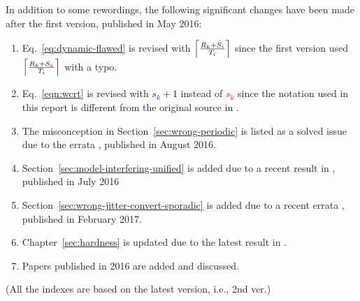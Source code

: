 \documentclass[twoside,titlepage,fleqn,
                pointlessnumbers,headinclude,BCOR5mm,
                ]{scrreprt}
\newcommand{\ceiling}[1]{\left\lceil{#1}\right\rceil}
\begin{document}
In addition to some rewordings, the following significant changes have
been made after the first version, published in May 2016:
\begin{enumerate}
\item Eq.~\eqref{eq:dynamic-flawed} is revised with
  $\ceiling{\frac{R_k + S_{\textcolor{blue}{i}}}{T_i}}$  since the first
  version used $\ceiling{\frac{R_k + S_{\textcolor{red}{k}}}{T_i}}$
  with a typo.
\item Eq.~\eqref{eqn:wcrt} is revised with \textcolor{blue}{$s_k+1$} instead of
  \textcolor{red}{$s_k$} since the notation used in this report is different
  from the original source in \cite{lakshmanan-2009}.
\item The misconception in Section~\ref{sec:wrong-periodic} is 
  listed as a solved issue due to the errata \cite{Kim2016}, published
  in August 2016.
\item Section~\ref{sec:model-interfering-unified} is added due to a
  recent result in \cite{ChenECRTS2016-suspension}, published in July 2016
\item Section~\ref{sec:wrong-jitter-convert-sporadic} is added due to
  a recent errata \cite{nelissen-errata-ECRTS15}, published in
  February 2017.
\item Chapter~\ref{sec:hardness} is updated due to the latest result
  in \cite{RTSS2016-suspension,DBLP:conf/rtns/MohaqeqiE016}.
\item Papers published in 2016 are added and discussed.
\end{enumerate}
(All the indexes are based on the latest version, i.e., 2nd ver.)



{}


%
\end{document}
